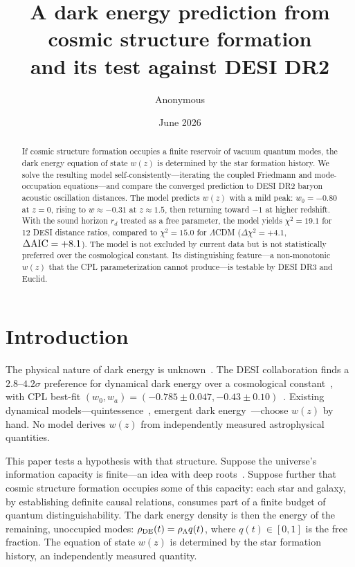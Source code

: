 \documentclass[12pt,a4paper]{article}
\begin{document}
\title{\bf A dark energy prediction from cosmic structure formation\\
and its test against DESI DR2}

\author{Anonymous}
\date{June 2026}

\maketitle

\begin{abstract}
If cosmic structure formation occupies a finite reservoir of vacuum quantum modes, the dark energy equation of state $w(z)$ is determined by the star formation history. We solve the resulting model self-consistently---iterating the coupled Friedmann and mode-occupation equations---and compare the converged prediction to DESI DR2 baryon acoustic oscillation distances. The model predicts $w(z)$ with a mild peak: $w_0=-0.80$ at $z=0$, rising to $w\approx-0.31$ at $z\approx1.5$, then returning toward $-1$ at higher redshift. With the sound horizon $r_d$ treated as a free parameter, the model yields $\chi^2=19.1$ for 12 DESI distance ratios, compared to $\chi^2=15.0$ for $\Lambda$CDM ($\Delta\chi^2=+4.1$, $\Delta{\rm AIC}=+8.1$). The model is not excluded by current data but is not statistically preferred over the cosmological constant. Its distinguishing feature---a non-monotonic $w(z)$ that the CPL parameterization cannot produce---is testable by DESI DR3 and Euclid.
\end{abstract}

\section*{Introduction}

The physical nature of dark energy is unknown~\cite{riess1998,spergel2003}. The DESI collaboration finds a $2.8$--$4.2\sigma$ preference for dynamical dark energy over a cosmological constant~\cite{desi2025}, with CPL best-fit $(w_0,w_a)=(-0.785\pm0.047,-0.43\pm0.10)$~\cite{li2026}. Existing dynamical models---quintessence~\cite{tsujikawa2013}, emergent dark energy~\cite{li2024}---choose $w(z)$ by hand. No model derives $w(z)$ from independently measured astrophysical quantities.

This paper tests a hypothesis with that structure. Suppose the universe's information capacity is finite---an idea with deep roots~\cite{thooft1993,susskind1995,verlinde2011,jacobson1995}. Suppose further that cosmic structure formation occupies some of this capacity: each star and galaxy, by establishing definite causal relations, consumes part of a finite budget of quantum distinguishability. The dark energy density is then the energy of the remaining, unoccupied modes: $\rho_{\rm DE}(t)=\rho_\Lambda q(t)$, where $q(t)\in[0,1]$ is the free fraction. The equation of state $w(z)$ is determined by the star formation history, an independently measured quantity.
\end{document}
